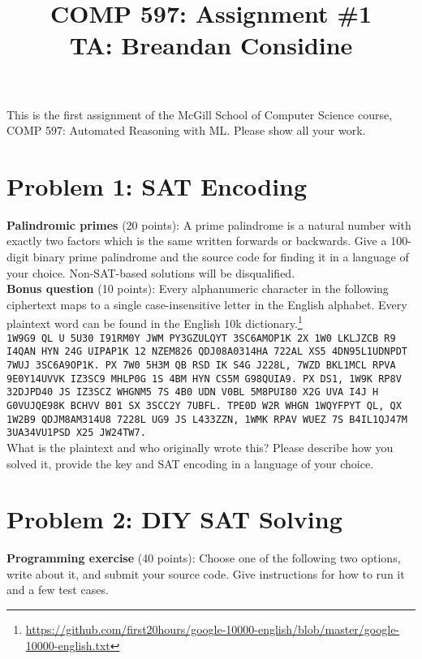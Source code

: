 \documentclass[11pt]{article}
\title{COMP 597: Assignment \#1\\\vspace{10pt}\small{TA: Breandan Considine}}
\begin{document}
    \maketitle
    \noindent This is the first assignment of the McGill School of Computer Science course, COMP 597: Automated Reasoning with ML. Please show all your work.

    \section{Problem 1: SAT Encoding}

    \noindent \textbf{Palindromic primes} (20 points): A prime palindrome is a natural number with exactly two factors which is the same written forwards or backwards. Give a 100-digit binary prime palindrome and the source code for finding it in a language of your choice. Non-SAT-based solutions will be disqualified.\\

    \noindent \textbf{Bonus question} (10 points): Every alphanumeric character in the following ciphertext maps to a single case-insensitive letter in the English alphabet. Every plaintext word can be found in the English 10k dictionary.\footnote{\url{https://github.com/first20hours/google-10000-english/blob/master/google-10000-english.txt}}\\

    \noindent \texttt{1W9G9 QL U 5U30 I91RM0Y JWM PY3GZULQYT 3SC6AMOP1K 2X 1W0 LKLJZCB R9 I4QAN HYN 24G UIPAP1K 12 NZEM826 QDJ08A0314HA 722AL XS5 4DN95L1UDNPDT 7WUJ 3SC6A9OP1K. PX 7W0 5H3M QB RSD IK S4G J228L, 7WZD BKL1MCL RPVA 9E0Y14UVVK IZ3SC9 MHLP0G 1S 4BM HYN CS5M G98QUIA9. PX DS1, 1W9K RP8V 32DJPD40 JS IZ3SCZ WHGNM5 7S 4B0 UDN V0BL 5M8PUI80 X2G UVA I4J H G0VUJQE98K BCHVV B01 SX 3SCC2Y 7UBFL. TPE0D W2R WHGN 1WQYFPYT QL, QX 1W2B9 QDJM8AM314U8 7228L UG9 JS L433ZZN, 1WMK RPAV WUEZ 7S B4IL1QJ47M 3UA34VU1PSD X25 JW24TW7.}\\

    \noindent What is the plaintext and who originally wrote this? Please describe how you solved it, provide the key and SAT encoding in a language of your choice.

    \pagebreak\section{Problem 2: DIY SAT Solving}

    \noindent \textbf{Programming exercise} (40 points): Choose one of the following two options, write about it, and submit your source code. Give instructions for how to run it and a few test cases.
\end{document}
